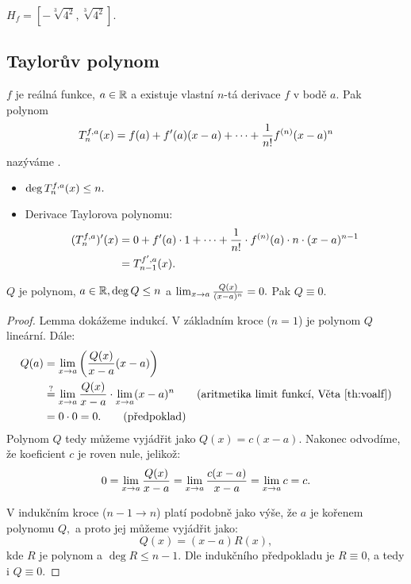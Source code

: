\begin{example}
\begin{enumerate}
            $H_f = [-\sqrt[3]{4^2},\sqrt[3]{4^2}].$
    \end{enumerate}
\end{example}

\subsection{Taylorův polynom}

\begin{definition}
    \Necht $f$ je reálná funkce, $a \in \mathbb{R}$ a existuje vlastní $n$-tá derivace
    $f$ v bodě $a.$ Pak polynom
    $$T_n^{f,a}(x) = f(a) + f'(a)(x-a) + \dots + \frac{1}{n!}f^{(n)}(x-a)^n$$
    nazýváme .
\end{definition}

\begin{remark}
    \leavevmode
    \begin{itemize}
        \item $\deg T_n^{f,a}(x) \leq n.$
        \item Derivace Taylorova polynomu:
            \begin{align*}
                (T_n^{f,a})'(x) 
                &= 0 + f'(a) \cdot 1 + \dots + \frac{1}{n!} \cdot f^{(n)}(a)\cdot n \cdot (x-a)^{n-1} \\
                &= T^{f',a}_{n-1}(x).
            \end{align*}
    \end{itemize}
\end{remark}

\begin{lemma}
    \label{lm:taylorqp0}
    \Necht $Q$ je polynom, $a \in \mathbb{R}, \deg Q \leq n$ 
    a $\lim_{x \to a} \frac{Q(x)}{(x-a)^n} = 0.$ Pak $Q \equiv 0.$
\end{lemma}

\begin{proof}
    Lemma dokážeme indukcí. V základním kroce ($n=1$) je polynom $Q$ lineární. 
    Dále:
    \begin{align*}
        Q(a)
        &= \limxa \left(\frac{Q(x)}{x-a}(x-a)\right) \\
        &\qe \limxa \frac{Q(x)}{x-a} \cdot \limxa (x-a)^n 
            \tag{aritmetika limit funkcí, Věta~\ref{th:voalf}}\\
        &= 0 \cdot 0 = 0. \tag{předpoklad}
    \end{align*}
    Polynom $Q$ tedy můžeme vyjádřit jako $Q(x) = c(x-a).$ Nakonec
    odvodíme, že koeficient $c$ je roven nule, jelikož:
    $$ 0 = \lim_{x \to a} \frac{Q(x)}{x-a} = \lim_{x \to a} \frac{c(x-a)}{x-a} = \lim_{x \to a} c = c.$$

    V indukčním kroce ($n-1 \rightarrow n$) platí podobně jako výše, že $a$ je
    kořenem polynomu $Q,$ a proto jej můžeme vyjádřit jako:
    $$Q(x) = (x-a)R(x),$$
    kde $R$ je polynom a $\deg R \leq n-1.$ Dle indukčního předpokladu je 
    $R \equiv 0$, a tedy i $Q \equiv 0.$
\end{proof}

